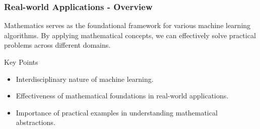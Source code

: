 \documentclass[aspectratio=169]{beamer}
\begin{document}
\begin{frame}[fragile]
    \frametitle{Real-world Applications - Overview}
    Mathematics serves as the foundational framework for various machine learning algorithms.
    By applying mathematical concepts, we can effectively solve practical problems across different domains.
    
    \begin{block}{Key Points}
        \begin{itemize}
            \item Interdisciplinary nature of machine learning.
            \item Effectiveness of mathematical foundations in real-world applications.
            \item Importance of practical examples in understanding mathematical abstractions.
        \end{itemize}
    \end{block}
\end{frame}
\end{document}
